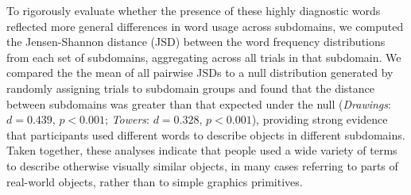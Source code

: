To rigorously evaluate whether the presence of these highly diagnostic words reflected more general differences in word usage across subdomains, we computed the Jensen-Shannon distance (JSD) between the word frequency distributions from each set of subdomains, aggregating across all trials in that subdomain.
We compared the the mean of all pairwise JSDs to a null distribution generated by randomly assigning trials to subdomain groups and found that the distance between subdomains was greater than that expected under the null (\textit{Drawings}: $d = 0.439$, $p < 0.001$; \textit{Towers}: $d = 0.328$, $p < 0.001$), providing strong evidence that participants used different words to describe objects in different subdomains.
Taken together, these analyses indicate that people used a wide variety of terms to describe otherwise visually similar objects, in many cases referring to parts of real-world objects, rather than to simple graphics primitives.





